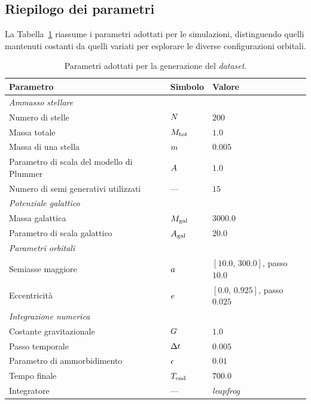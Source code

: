 \subsection{Riepilogo dei parametri}
\label{subsec:riepilogo-parametri}
La Tabella~\ref{tab:parametri-dataset} riassume i parametri adottati per le simulazioni, distinguendo quelli mantenuti costanti da quelli variati per esplorare le diverse configurazioni orbitali.
\begin{table}[H]
	\centering
	\caption{Parametri adottati per la generazione del \emph{dataset}.}
	\label{tab:parametri-dataset}
	\begin{tabular}{lll}
		\hline
		\textbf{Parametro} & \textbf{Simbolo} & \textbf{Valore} \\
		\hline
		\multicolumn{3}{l}{\textit{Ammasso stellare}} \\
		Numero di stelle & $N$ & $200$ \\
		Massa totale & $M_{\mathrm{tot}}$ & $1.0$ \\
		Massa di una stella & $m$ & $0.005$ \\
		Parametro di scala del modello di Plummer & $A$ & $1.0$ \\
		Numero di semi generativi utilizzati & --- & $15$ \\
		\hline
		\multicolumn{3}{l}{\textit{Potenziale galattico}} \\
		Massa galattica & $M_{\mathrm{gal}}$ & $3000.0$ \\
		Parametro di scala galattico & $A_{\mathrm{gal}}$ & $20.0$ \\
		\hline
		\multicolumn{3}{l}{\textit{Parametri orbitali}} \\
		Semiasse maggiore & $a$ & $[10.0,\,300.0]$, passo $10.0$ \\
		Eccentricità & $e$ & $[0.0,\,0.925]$, passo $0.025$ \\
		\hline
		\multicolumn{3}{l}{\textit{Integrazione numerica}} \\
		Costante gravitazionale & $G$ & $1.0$ \\
		Passo temporale & $\Delta t$ & $0.005$ \\
		Parametro di ammorbidimento & $\epsilon$ & $0.01$ \\
		Tempo finale & $T_{\mathrm{end}}$ & $700.0$ \\
		Integratore & --- & \emph{leapfrog} \\
		\hline
	\end{tabular}
\end{table}
